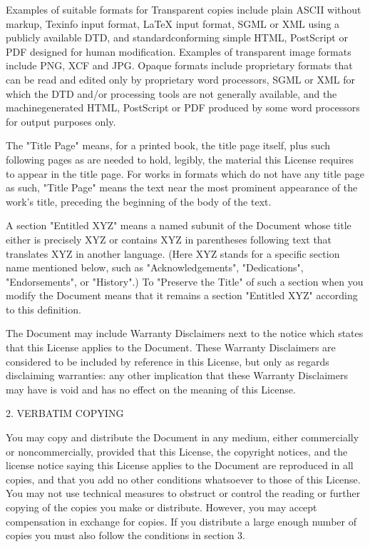 \documentclass[a4paper,11pt]{report}
\begin{document}
{ Examples of suitable formats for Transparent copies include plain ASCII
without markup, Texinfo input format, LaTeX input format, SGML or XML using a
publicly available DTD, and standard\texttt{}conforming simple
HTML, PostScript or PDF designed for human modification. Examples of
transparent image formats include PNG, XCF and JPG. Opaque formats include
proprietary formats that can be read and edited only by proprietary word
processors, SGML or XML for which the DTD and/or processing tools are not
generally available, and the machine\texttt{}generated HTML,
PostScript or PDF produced by some word processors for output purposes only. 

 The "Title Page" means, for a printed book, the title page itself, plus such
following pages as are needed to hold, legibly, the material this License
requires to appear in the title page. For works in formats which do not have
any title page as such, "Title Page" means the text near the most prominent
appearance of the work's title, preceding the beginning of the body of the
text. 

 A section "Entitled XYZ" means a named subunit of the Document whose title
either is precisely XYZ or contains XYZ in parentheses following text that
translates XYZ in another language. (Here XYZ stands for a specific section
name mentioned below, such as "Acknowledgements", "Dedications",
"Endorsements", or "History".) To "Preserve the Title" of such a section when
you modify the Document means that it remains a section "Entitled XYZ"
according to this definition. 

 The Document may include Warranty Disclaimers next to the notice which states
that this License applies to the Document. These Warranty Disclaimers are
considered to be included by reference in this License, but only as regards
disclaiming warranties: any other implication that these Warranty Disclaimers
may have is void and has no effect on the meaning of this License. 

 2. VERBATIM COPYING 

 You may copy and distribute the Document in any medium, either commercially or
noncommercially, provided that this License, the copyright notices, and the
license notice saying this License applies to the Document are reproduced in
all copies, and that you add no other conditions whatsoever to those of this
License. You may not use technical measures to obstruct or control the reading
or further copying of the copies you make or distribute. However, you may
accept compensation in exchange for copies. If you distribute a large enough
number of copies you must also follow the conditions in section 3. 

}
\end{document}
